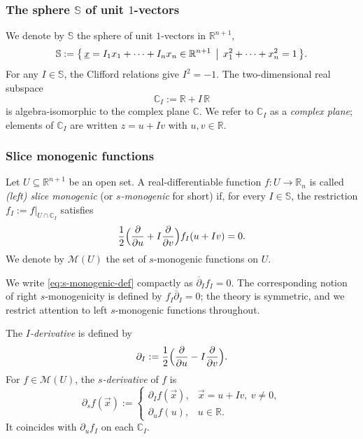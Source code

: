 \documentclass[11pt]{amsart}
\begin{document}
\subsubsection{The sphere $\mathbb{S}$ of unit $1$-vectors}

We denote by $\mathbb{S}$ the sphere of unit $1$-vectors in $\mathbb{R}^{n+1}$,
\[
\mathbb{S} := \bigl\{\, \underline x = I_1 x_1 + \cdots + I_n x_n \in \mathbb{R}^{n+1} \,\bigm|\, x_1^2 + \cdots + x_n^2 = 1 \,\bigr\}.
\]
For any $I \in \mathbb{S}$, the Clifford relations give $I^2 = -1$. The two-dimensional real subspace
\[
\mathbb{C}_I := \mathbb{R} + I \, \mathbb{R}
\]
is algebra-isomorphic to the complex plane $\mathbb{C}$. We refer to $\mathbb{C}_I$ as a \emph{complex plane}; elements of $\mathbb{C}_I$ are written $z = u + Iv$ with $u, v \in \mathbb{R}$.

\subsubsection{Slice monogenic functions}

\begin{definition}\label{def:slice-monogenic}
Let $U \subseteq \mathbb{R}^{n+1}$ be an open set. A real-differentiable function $f \colon U \to \mathbb{R}_n$ is called \emph{(left) slice monogenic} (or \emph{$s$-monogenic} for short) if, for every $I \in \mathbb{S}$, the restriction $f_I := f|_{U \cap \mathbb{C}_I}$ satisfies
\begin{equation}\label{eq:s-monogenic-def}
\frac{1}{2}\Bigl(\frac{\partial}{\partial u} + I \frac{\partial}{\partial v}\Bigr) f_I(u + Iv) = 0.
\end{equation}
We denote by $\mathcal M(U)$ the set of $s$-monogenic functions on $U$.
\end{definition}

\noindent We write \eqref{eq:s-monogenic-def} compactly as $\overline\partial_I f_I = 0$. The corresponding notion of right $s$-monogenicity is defined by $f_I \overline \partial_I = 0$; the theory is symmetric, and we restrict attention to left $s$-monogenic functions throughout.

\begin{definition}[$s$-derivative]\label{def:s-derivative}
The \emph{$I$-derivative} is defined by
\[
\partial_I := \frac{1}{2}\Bigl(\frac{\partial}{\partial u} - I \frac{\partial}{\partial v}\Bigr).
\]
For $f \in \mathcal M(U)$, the \emph{$s$-derivative} of $f$ is
\[
\partial_s f(\vec x) :=
\begin{cases}
\partial_I f(\vec x), & \vec x = u + Iv,\ v \ne 0,\\
\partial_u f(u), & u \in \mathbb{R}.
\end{cases}
\]
It coincides with $\partial_u f_I$ on each $\mathbb{C}_I$.
\end{definition}
\end{document}
